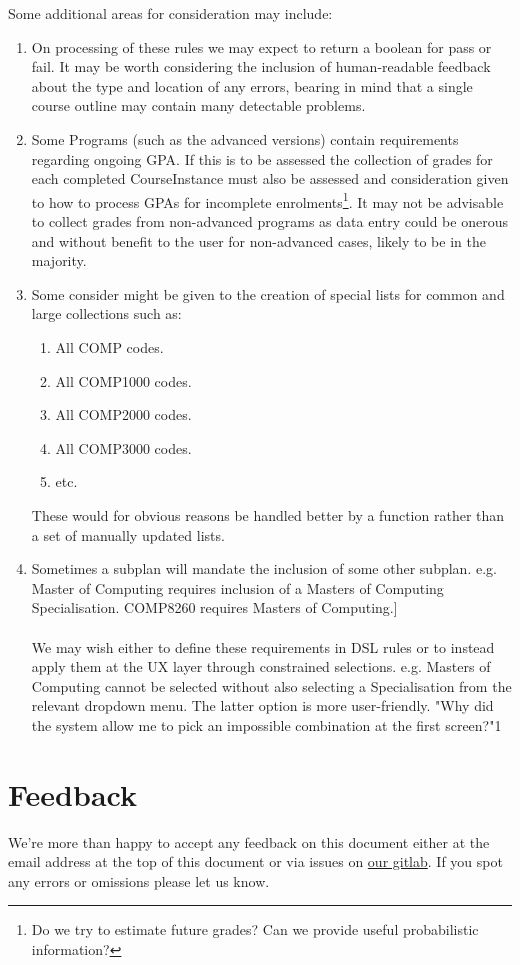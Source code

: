 \documentclass[twoside,twocolumn]{article}
\begin{document}
Some additional areas for consideration may include:
\begin{enumerate}
\item On processing of these rules we may expect to return a boolean for pass or fail. It may be worth considering the inclusion of human-readable feedback about the type and location of any errors, bearing in mind that a single course outline may contain many detectable problems.
\item Some Programs (such as the advanced versions) contain requirements regarding ongoing GPA. If this is to be assessed the collection of grades for each completed CourseInstance must also be assessed and consideration given to how to process GPAs for incomplete enrolments\footnote{Do we try to estimate future grades? Can we provide useful probabilistic information?}. It may not be advisable to collect grades from non-advanced programs as data entry could be onerous and without benefit to the user for non-advanced cases, likely to be in the majority.
\item Some consider might be given to the creation of special lists for common and large collections such as:
\begin{enumerate}
\item All COMP codes.
\item All COMP1000 codes.
\item All COMP2000 codes.
\item All COMP3000 codes.
\item etc.\\
\end{enumerate}
These would for obvious reasons be handled better by a function rather than a set of manually updated lists.
\item Sometimes a subplan will mandate the inclusion of some other subplan. e.g. Master of Computing requires inclusion of a Masters of Computing Specialisation. COMP8260 requires Masters of Computing.]
\paragraph*{}
We may wish either to define these requirements in DSL rules or to instead apply them at the UX layer through constrained selections. e.g. Masters of Computing cannot be selected without also selecting a Specialisation from the  relevant dropdown menu. The latter option is more user-friendly. "Why did the system allow me to pick an impossible combination at the first screen?"1
\end{enumerate}
\section{Feedback}
We're more than happy to accept any feedback on this document either at the email address at the top of this document or via issues on \href{https://gitlab.cecs.anu.edu.au/u6087050/Bindi/issues}{our gitlab}. If you spot any errors or omissions please let us know.

\end{document}
